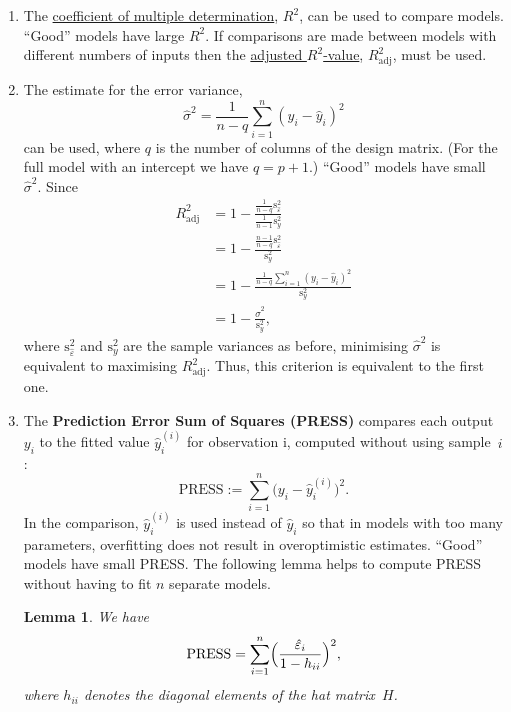 \documentclass[
  a4paper,
]{article}
\newtheorem{lemma}{Lemma}[section]
\theoremstyle{definition}
\theoremstyle{definition}
\theoremstyle{definition}
\theoremstyle{definition}
\theoremstyle{remark}
\begin{document}
\begin{enumerate}
\def\labelenumi{\arabic{enumi}.}
\item
  The \protect\hyperlink{def:R-squared}{coefficient of multiple determination}, \(R^2\), can be used
  to compare models. ``Good'' models have large \(R^2\).
  If comparisons are made between models with different
  numbers of inputs then the \protect\hyperlink{def:adjusted-R-squared}{adjusted \(R^2\)-value},
  \(R^2_\mathrm{adj}\), must be used.
\item
  The estimate for the error variance,
  \begin{equation*}
   \hat\sigma^2 = \frac{1}{n - q} \sum_{i=1}^n (y_i - \hat y_i)^2
    \end{equation*}
  can be used, where \(q\) is the number of columns of the design matrix.
  (For the full model with an intercept we have \(q = p+1\).)
  ``Good'' models have small \(\hat\sigma^2\). Since
  \begin{align*}
   R^2_\mathrm{adj}
   &= 1 - \frac{\frac{1}{n-q}\mathrm{s}_{\hat\varepsilon}^2}{\frac{1}{n-1}\mathrm{s}_y^2} \\
   &= 1 - \frac{\frac{n-1}{n-q}\mathrm{s}_{\hat\varepsilon}^2}{\mathrm{s}_y^2} \\
   &= 1 - \frac{\frac{1}{n-q} \sum_{i=1}^n (y_i - \hat y_i)^2}{\mathrm{s}_y^2} \\
   &= 1 - \frac{\hat\sigma^2}{\mathrm{s}_y^2},
    \end{align*}
  where \(\mathrm{s}_{\hat\varepsilon}^2\) and \(\mathrm{s}_y^2\) are the sample variances
  as before, minimising \(\hat\sigma^2\) is equivalent to
  maximising \(R^2_\mathrm{adj}\). Thus, this criterion is equivalent to
  the first one.
\item
  The \textbf{Prediction Error Sum of Squares (PRESS)} compares each
  output \(y_i\) to the fitted value \(\hat y^{(i)}_i\) for observation i,
  computed without using sample~\(i\):
  \begin{equation*}
    \mathrm{PRESS}
    := \sum_{i=1}^n \bigl( y_i - \hat y^{(i)}_i \bigr)^2.
  \end{equation*}
  In the comparison, \(\hat y^{(i)}_i\) is used instead of \(\hat y_i\)
  so that in models with too many parameters, overfitting does not
  result in overoptimistic estimates.
  ``Good'' models have small PRESS. The following lemma helps to compute
  PRESS without having to fit \(n\) separate models.

  \begin{lemma}
  \protect\hypertarget{lem:PRESS}{}\label{lem:PRESS}We have
  \begin{equation*}
    \mathrm{PRESS}
    = \sum_{i=1}^n \Bigl( \frac{\hat\varepsilon_i}{1 - h_{ii}} \Bigr)^2,
  \end{equation*}
  where \(h_{ii}\) denotes the diagonal elements of the hat matrix~\(H\).
  \end{lemma}


\end{enumerate}
\end{document}
